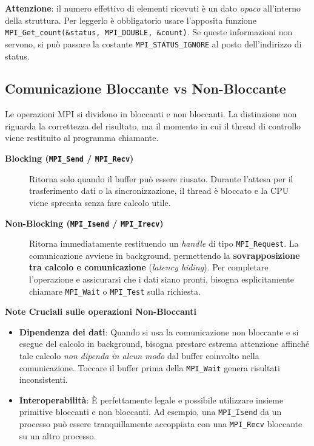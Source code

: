 \noindent
\textbf{Attenzione}: il numero effettivo di elementi ricevuti è un dato \textit{opaco} all'interno della struttura. Per leggerlo è obbligatorio usare l'apposita funzione \texttt{MPI\_Get\_count(\&status, MPI\_DOUBLE, \&count)}. Se queste informazioni non servono, si può passare la costante \texttt{MPI\_STATUS\_IGNORE} al posto dell'indirizzo di status.

\subsection{Comunicazione Bloccante vs Non-Bloccante}
Le operazioni MPI si dividono in bloccanti e non bloccanti. La distinzione non riguarda la correttezza del risultato, ma il momento in cui il thread di controllo viene restituito al programma chiamante.

\begin{description}
    \item[\textbf{Blocking (\texttt{MPI\_Send} / \texttt{MPI\_Recv})}] Ritorna solo quando il buffer può essere riusato. Durante l'attesa per il trasferimento dati o la sincronizzazione, il thread è bloccato e la CPU viene sprecata senza fare calcolo utile.
    \item[\textbf{Non-Blocking (\texttt{MPI\_Isend} / \texttt{MPI\_Irecv})}] Ritorna immediatamente restituendo un \textit{handle} di tipo \texttt{MPI\_Request}. La comunicazione avviene in background, permettendo la \textbf{sovrapposizione tra calcolo e comunicazione} (\textit{latency hiding}). Per completare l'operazione e assicurarsi che i dati siano pronti, bisogna esplicitamente chiamare \texttt{MPI\_Wait} o \texttt{MPI\_Test} sulla richiesta.
\end{description}

\begin{framed}
\noindent
\textbf{Note Cruciali sulle operazioni Non-Bloccanti}
\begin{itemize}
    \item \textbf{Dipendenza dei dati}: Quando si usa la comunicazione non bloccante e si esegue del calcolo in background, bisogna prestare estrema attenzione affinché tale calcolo \textit{non dipenda in alcun modo} dal buffer coinvolto nella comunicazione. Toccare il buffer prima della \texttt{MPI\_Wait} genera risultati inconsistenti.
    \item \textbf{Interoperabilità}: È perfettamente legale e possibile utilizzare insieme primitive bloccanti e non bloccanti. Ad esempio, una \texttt{MPI\_Isend} da un processo può essere tranquillamente accoppiata con una \texttt{MPI\_Recv} bloccante su un altro processo.
\end{itemize}
\end{framed}

